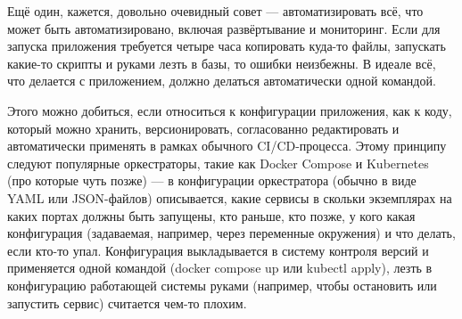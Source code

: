 \documentclass[a5paper]{article}
\begin{document}
Ещё один, кажется, довольно очевидный совет --- автоматизировать всё, что может быть автоматизировано, включая развёртывание и мониторинг. Если для запуска приложения требуется четыре часа копировать куда-то файлы, запускать какие-то скрипты и руками лезть в базы, то ошибки неизбежны. В идеале всё, что делается с приложением, должно делаться автоматически одной командой.

Этого можно добиться, если относиться к конфигурации приложения, как к коду, который можно хранить, версионировать, согласованно редактировать и автоматически применять в рамках обычного CI/CD-процесса. Этому принципу следуют популярные оркестраторы, такие как Docker Compose и Kubernetes (про которые чуть позже) --- в конфигурации оркестратора (обычно в виде YAML или JSON-файлов) описывается, какие сервисы в скольки экземплярах на каких портах должны быть запущены, кто раньше, кто позже, у кого какая конфигурация (задаваемая, например, через переменные окружения) и что делать, если кто-то упал. Конфигурация выкладывается в систему контроля версий и применяется одной командой (docker compose up или kubectl apply), лезть в конфигурацию работающей системы руками (например, чтобы остановить или запустить сервис) считается чем-то плохим.
\end{document}

